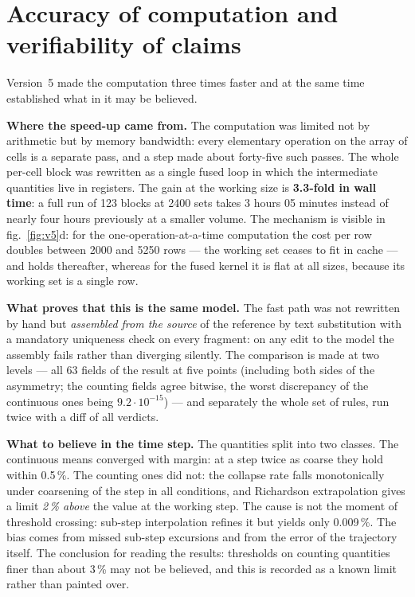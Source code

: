 \section{Accuracy of computation and verifiability of claims}\label{sec:prec}
Version~5 made the computation three times faster and at the same time established what in it may be believed.

\textbf{Where the speed-up came from.} The computation was limited not by arithmetic but by memory bandwidth: every elementary operation on the array of cells is a separate pass, and a step made about forty-five such passes. The whole per-cell block was rewritten as a single fused loop in which the intermediate quantities live in registers. The gain at the working size is \textbf{3.3-fold in wall time}: a full run of 123 blocks at 2400 sets takes 3 hours 05 minutes instead of nearly four hours previously at a smaller volume. The mechanism is visible in fig.~\ref{fig:v5}d: for the one-operation-at-a-time computation the cost per row doubles between 2000 and 5250 rows --- the working set ceases to fit in cache --- and holds thereafter, whereas for the fused kernel it is flat at all sizes, because its working set is a single row.

\textbf{What proves that this is the same model.} The fast path was not rewritten by hand but \emph{assembled from the source} of the reference by text substitution with a mandatory uniqueness check on every fragment: on any edit to the model the assembly fails rather than diverging silently. The comparison is made at two levels --- all 63 fields of the result at five points (including both sides of the asymmetry; the counting fields agree bitwise, the worst discrepancy of the continuous ones being $9.2\cdot10^{-15}$) --- and separately the whole set of rules, run twice with a diff of all verdicts.

\textbf{What to believe in the time step.} The quantities split into two classes. The continuous means converged with margin: at a step twice as coarse they hold within 0.5\,\%. The counting ones did not: the collapse rate falls monotonically under coarsening of the step in all conditions, and Richardson extrapolation gives a limit \emph{2\,\% above} the value at the working step. The cause is not the moment of threshold crossing: sub-step interpolation refines it but yields only 0.009\,\%. The bias comes from missed sub-step excursions and from the error of the trajectory itself. The conclusion for reading the results: thresholds on counting quantities finer than about 3\,\% may not be believed, and this is recorded as a known limit rather than painted over.

